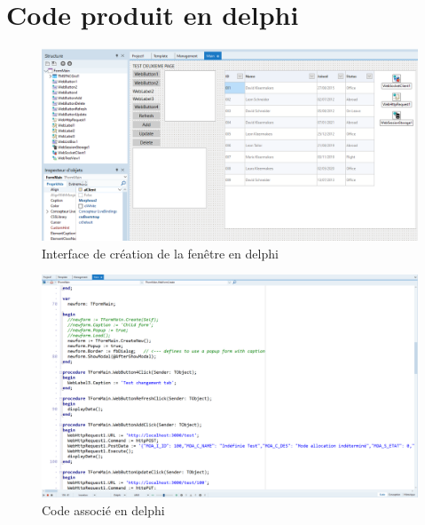 \documentclass[a4paper, 12pt, french]{article}
\begin{document}
		\section{Code produit en \gls{delphi}}\label{appendix:delphi_code}
			\begin{figure}[ht!]
				\begin{center}
					\includegraphics[width=0.9\linewidth]{images/delphi_dev_form.png}
				\end{center}
				\caption{Interface de création de la fenêtre en \gls{delphi}}
				\label{fig:delphi_dev_form}
			\end{figure}
	
			\begin{figure}[ht!]
				\begin{center}
					\includegraphics[width=0.9\linewidth]{images/delphi_dev_code.png}
				\end{center}
				\caption{Code associé en \gls{delphi}}
				\label{fig:delphi_dev_code}
			\end{figure}

		\newpage
\end{document}
